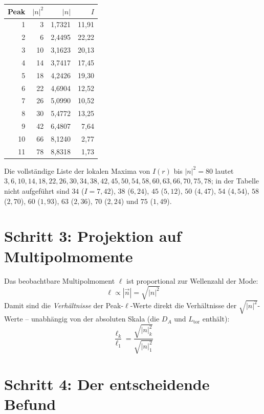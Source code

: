 \begin{center}
\begin{tabular}{rrrr}
\toprule
Peak & $|n|^2$ & $|n|$ & $I$ \\
\midrule
1 & 3  & 1{,}7321 & 11{,}91 \\
2 & 6  & 2{,}4495 & 22{,}22 \\
3 & 10 & 3{,}1623 & 20{,}13 \\
4 & 14 & 3{,}7417 & 17{,}45 \\
5 & 18 & 4{,}2426 & 19{,}30 \\
6 & 22 & 4{,}6904 & 12{,}52 \\
7 & 26 & 5{,}0990 & 10{,}52 \\
8 & 30 & 5{,}4772 & 13{,}25 \\
9 & 42 & 6{,}4807 & 7{,}64  \\
10 & 66 & 8{,}1240 & 2{,}77 \\
11 & 78 & 8{,}8318 & 1{,}73 \\
\bottomrule
\end{tabular}
\end{center}
Die vollständige Liste der lokalen Maxima von $I(r)$ bis $|n|^2=80$ lautet
$3, 6, 10, 14, 18, 22, 26, 30, 34, 38, 42, 45, 50, 54, 58, 60, 63, 66, 70, 75, 78$;
in der Tabelle nicht aufgeführt sind $34$ ($I=7{,}42$), $38$ ($6{,}24$),
$45$ ($5{,}12$), $50$ ($4{,}47$), $54$ ($4{,}54$), $58$ ($2{,}70$),
$60$ ($1{,}93$), $63$ ($2{,}36$), $70$ ($2{,}24$) und $75$ ($1{,}49$).

\section{Schritt 3: Projektion auf Multipolmomente}

Das beobachtbare Multipolmoment $\ell$ ist proportional zur
Wellenzahl der Mode:
\[
  \ell \propto |\vec{n}| = \sqrt{|n|^2}
\]
Damit sind die \emph{Verhältnisse} der Peak-$\ell$-Werte direkt die
Verhältnisse der $\sqrt{|n|^2}$-Werte -- unabhängig von der absoluten
Skala (die $D_A$ und $L_\mathrm{tor}$ enthält):
\[
  \frac{\ell_k}{\ell_1} = \frac{\sqrt{|n|^2_k}}{\sqrt{|n|^2_1}}
\]

\section{Schritt 4: Der entscheidende Befund}

